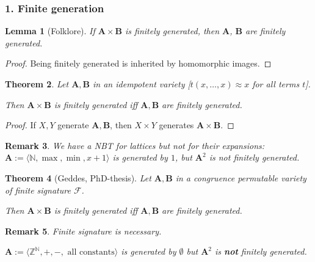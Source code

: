 \documentclass{beamer}
\newtheorem{thm}{Theorem}
\newtheorem{lem}[thm]{Lemma}
\newtheorem{rem}[thm]{Remark}
\theoremstyle{definition}
\newcommand{\algop}[2]{\langle {#1}, {#2} \rangle}
\newcommand{\F}{\mathcal{F}}
\newcommand{\A}{{\mathbf A}}
\newcommand{\B}{{\mathbf B}}
\newcommand{\Z}{{\mathbb Z}}
\newcommand{\N}{{\mathbb N}}
\begin{document}
\begin{frame}
\frametitle{1. Finite generation}

\begin{lem}[Folklore]
 If $\A\times\B$ is finitely generated, then $\A$, $\B$ are finitely generated.
\end{lem}

\begin{proof}
 Being finitely generated is inherited by homomorphic images.
\end{proof}


\begin{thm}
 Let $\A,\B$ in an idempotent variety [$t(x,\dots,x)\approx x$ for all terms $t$].

 Then $\A\times\B$ is finitely generated iff $\A,\B$ are finitely generated. 
\end{thm}

\begin{proof}
 If $X,Y$ generate $\A,\B$, then $X\times Y$ generates $\A\times\B$.
\end{proof}


\begin{rem}
 We have a {\color{red}NBT for lattices} but not for their expansions:
 $\A := \algop{\N}{\max,\min,x+1}$ is generated by $1$, but $\A^2$ is not 
 finitely generated.  
\end{rem}
\end{frame}





\begin{frame}

\begin{thm}[Geddes, PhD-thesis]
 Let $\A,\B$ in a congruence permutable variety of finite signature $\F$.

 Then $\A\times\B$ is finitely generated iff $\A,\B$ are finitely generated.
\end{thm}


\begin{rem}
 Finite signature is necessary.

 $\A := \algop{\Z^\N}{+,-,\text{ all constants}}$ is generated by $\emptyset$
 but $\A^2$ is {\bf not} finitely generated.
\end{rem}
\end{frame}
\end{document}
